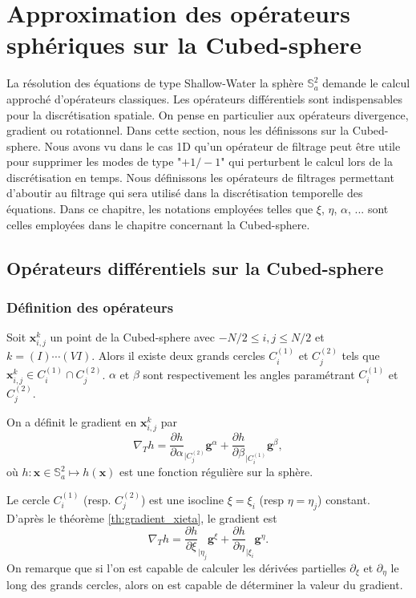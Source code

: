 
\chapter{Approximation des opérateurs sphériques sur la Cubed-sphere}

La résolution des équations de type Shallow-Water \REF la sphère $\mathbb{S}_a^2$ demande le calcul approché d'opérateurs classiques. Les opérateurs différentiels sont indispensables pour la discrétisation spatiale. On pense en particulier aux opérateurs divergence, gradient ou rotationnel. Dans cette section, nous les définissons sur la Cubed-sphere. 
Nous avons vu dans le cas 1D qu'un opérateur de filtrage peut être utile pour supprimer les modes de type "$+1/-1$" qui perturbent le calcul lors de la discrétisation en temps. Nous définissons les opérateurs de filtrages permettant d'aboutir au filtrage qui sera utilisé dans la discrétisation temporelle des équations.
Dans ce chapitre, les notations employées telles que $\xi$, $\eta$, $\alpha$, ... sont celles employées dans le chapitre \REF concernant la Cubed-sphere.

\section{Opérateurs différentiels sur la Cubed-sphere}

\subsection{Définition des opérateurs}
Soit $\mathbf{x}_{i,j}^k$ un point de la Cubed-sphere avec $- N/2 \leq i,j \leq N/2$ et $k = (I) \cdots (VI)$. Alors il existe deux grands cercles $C_i^{(1)}$ et $C_j^{(2)}$ tels que $\mathbf{x}_{i,j}^k \in C_i^{(1)} \cap C^{(2)}_j$. $\alpha$ et $\beta$ sont respectivement les angles paramétrant $C_i^{(1)}$ et $C_j^{(2)}$.

On a définit le gradient en $\mathbf{x}_{i,j}^k$ par 
\begin{equation}
\nabla_T h = \dfrac{\partial h}{\partial \alpha}_{|C^{(2)}_j} \mathbf{g}^{\alpha} + \dfrac{\partial h}{\partial \beta}_{|C^{(1)}_i} \mathbf{g}^{\beta},
\end{equation}
où $h : \mathbf{x} \in \mathbb{S}_a^2 \mapsto h(\mathbf{x})$ est une fonction régulière sur la sphère.

Le cercle $C_i^{(1)}$ (resp. $C_j^{(2)}$) est une isocline $\xi = \xi_i$ (resp $\eta = \eta_j$) constant. D'après le théorème \eqref{th:gradient_xieta}, le gradient est 
\begin{equation}
\nabla_T h = \dfrac{\partial h}{\partial \xi}_{|\eta_j} \mathbf{g}^{\xi} + \dfrac{\partial h}{\partial \eta}_{|\xi_i} \mathbf{g}^{\eta}.
\end{equation}
On remarque que si l'on est capable de calculer les dérivées partielles $\partial_{\xi}$ et $\partial_{\eta}$ le long des grands cercles, alors on est capable de déterminer la valeur du gradient.

